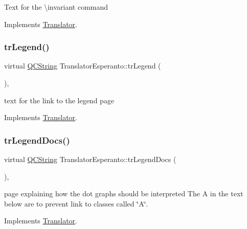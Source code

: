 Text for the \textbackslash{}invariant command 

Implements \mbox{\hyperlink{class_translator}{Translator}}.

\mbox{\label{class_translator_esperanto_adff9d013d482382d8c423c9e11655dc9}} 
\subsubsection{\texorpdfstring{trLegend()}{trLegend()}}
{\footnotesize\ttfamily virtual \mbox{\hyperlink{class_q_c_string}{Q\+C\+String}} Translator\+Esperanto\+::tr\+Legend (\begin{DoxyParamCaption}{ }\end{DoxyParamCaption})\hspace{0.3cm}{\ttfamily [inline]}, {\ttfamily [virtual]}}

text for the link to the legend page 

Implements \mbox{\hyperlink{class_translator}{Translator}}.

\mbox{\label{class_translator_esperanto_a1a9bf399e70260dbc87fee4e87070354}} 
\subsubsection{\texorpdfstring{trLegendDocs()}{trLegendDocs()}}
{\footnotesize\ttfamily virtual \mbox{\hyperlink{class_q_c_string}{Q\+C\+String}} Translator\+Esperanto\+::tr\+Legend\+Docs (\begin{DoxyParamCaption}{ }\end{DoxyParamCaption})\hspace{0.3cm}{\ttfamily [inline]}, {\ttfamily [virtual]}}

page explaining how the dot graph\textquotesingle{}s should be interpreted The A in the text below are to prevent link to classes called \char`\"{}\+A\char`\"{}. 

Implements \mbox{\hyperlink{class_translator}{Translator}}.

\mbox{\label{class_translator_esperanto_acd5e077a228a4d37153fbee54c8d7f60}} 
